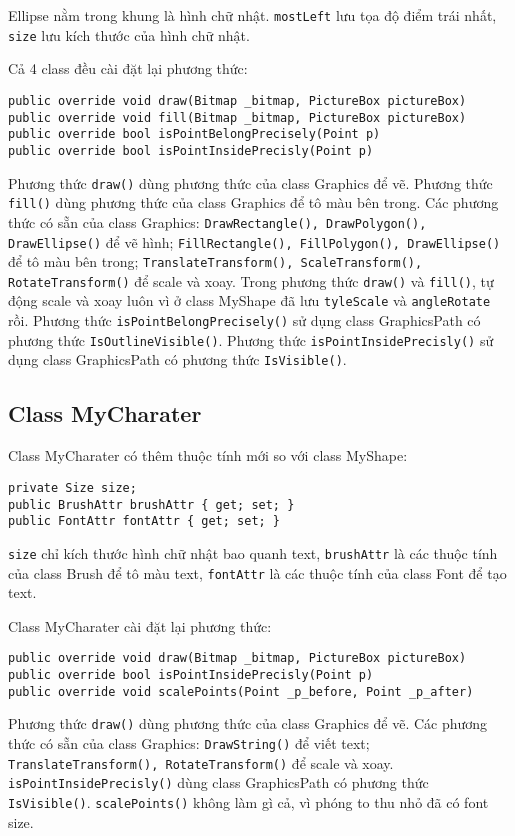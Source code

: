 \documentclass[12pt]{article}
\begin{document}
Ellipse nằm trong khung là hình chữ nhật.
\texttt{mostLeft} lưu tọa độ điểm trái nhất, \texttt{size} lưu kích thước của hình chữ nhật.

Cả 4 class đều cài đặt lại phương thức:
\begin{lstlisting}
public override void draw(Bitmap _bitmap, PictureBox pictureBox)
public override void fill(Bitmap _bitmap, PictureBox pictureBox)
public override bool isPointBelongPrecisely(Point p)
public override bool isPointInsidePrecisly(Point p)
\end{lstlisting}

Phương thức \texttt{draw()} dùng phương thức của class Graphics để vẽ.
Phương thức \texttt{fill()} dùng phương thức của class Graphics để tô màu bên trong.
Các phương thức có sẵn của class Graphics: \texttt{DrawRectangle(), DrawPolygon(), DrawEllipse()} để vẽ hình;
\texttt{FillRectangle(), FillPolygon(), DrawEllipse()} để tô màu bên trong;
\texttt{TranslateTransform(), ScaleTransform(), RotateTransform()} để scale và xoay.
Trong phương thức \texttt{draw()} và \texttt{fill()}, tự động scale và xoay luôn vì ở class MyShape đã lưu \texttt{tyleScale} và \texttt{angleRotate} rồi.
Phương thức \texttt{isPointBelongPrecisely()} sử dụng class GraphicsPath có phương thức \texttt{IsOutlineVisible()}.
Phương thức \texttt{isPointInsidePrecisly()} sử dụng class GraphicsPath có phương thức \texttt{IsVisible()}.

\subsection{Class MyCharater}
Class MyCharater có thêm thuộc tính mới so với class MyShape:
\begin{lstlisting}
private Size size;
public BrushAttr brushAttr { get; set; }
public FontAttr fontAttr { get; set; }
\end{lstlisting}
\texttt{size} chỉ kích thước hình chữ nhật bao quanh text,
\texttt{brushAttr} là các thuộc tính của class Brush để tô màu text,
\texttt{fontAttr} là các thuộc tính của class Font để tạo text.

Class MyCharater cài đặt lại phương thức:
\begin{lstlisting}
public override void draw(Bitmap _bitmap, PictureBox pictureBox)
public override bool isPointInsidePrecisly(Point p)
public override void scalePoints(Point _p_before, Point _p_after)
\end{lstlisting}

Phương thức \texttt{draw()} dùng phương thức của class Graphics để vẽ.
Các phương thức có sẵn của class Graphics: \texttt{DrawString()} để viết text;
\texttt{TranslateTransform(), RotateTransform()} để scale và xoay.
\texttt{isPointInsidePrecisly()} dùng class GraphicsPath có phương thức \texttt{IsVisible()}.
\texttt{scalePoints()} không làm gì cả, vì phóng to thu nhỏ đã có font size.
\end{document}
